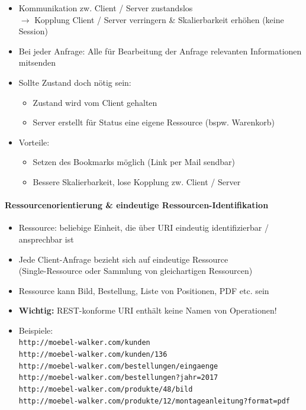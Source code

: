 \documentclass[a4paper]{article}
\begin{document}
				\begin{itemize}
					\item Kommunikation zw. Client / Server zustandslos\\
						$\rightarrow$ Kopplung Client / Server verringern \& Skalierbarkeit erhöhen (keine Session)
						
					\item Bei jeder Anfrage: Alle für Bearbeitung der Anfrage relevanten Informationen mitsenden
					
					\item Sollte Zustand doch nötig sein:
						\begin{itemize}
							\item Zustand wird vom Client gehalten
							\item Server erstellt für Status eine eigene Ressource (bspw. Warenkorb)
						\end{itemize}
					
					\item Vorteile:	
						\begin{itemize}
							\item Setzen des Bookmarks möglich (Link per Mail sendbar)
							\item Bessere Skalierbarkeit, lose Kopplung zw. Client / Server
						\end{itemize}
				\end{itemize}
			
			\paragraph{Ressourcenorientierung \& eindeutige Ressourcen-Identifikation}
			
				\begin{itemize}
					\item Ressource: beliebige Einheit, die über URI eindeutig identifizierbar / ansprechbar ist
					\item Jede Client-Anfrage bezieht sich auf eindeutige Ressource\\
					(Single-Ressource oder Sammlung von gleichartigen Ressourcen)
					\item Ressource kann Bild, Bestellung, Liste von Positionen, PDF etc. sein
					\item \textbf{Wichtig:} REST-konforme URI enthält keine Namen von Operationen!
					\item Beispiele:\\
					\texttt{http://moebel-walker.com/kunden\\
					http://moebel-walker.com/kunden/136\\
					http://moebel-walker.com/bestellungen/eingaenge\\
					http://moebel-walker.com/bestellungen?jahr=2017\\
					http://moebel-walker.com/produkte/48/bild\\
					http://moebel-walker.com/produkte/12/montageanleitung?format=pdf}
				\end{itemize}
			
\end{document}
